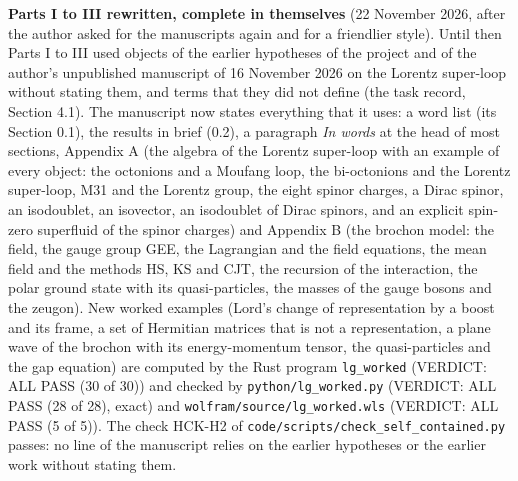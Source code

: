 \documentclass[
  10pt,
]{article}
\begin{document}
\textbf{Parts I to III rewritten, complete in themselves} (22 November
2026, after the author asked for the manuscripts again and for a
friendlier style). Until then Parts I to III used objects of the earlier
hypotheses of the project and of the author's unpublished manuscript of
16 November 2026 on the Lorentz super-loop without stating them, and
terms that they did not define (the task record, Section 4.1). The
manuscript now states everything that it uses: a word list (its Section
0.1), the results in brief (0.2), a paragraph \emph{In words} at the
head of most sections, Appendix A (the algebra of the Lorentz super-loop
with an example of every object: the octonions and a Moufang loop, the
bi-octonions and the Lorentz super-loop, M31 and the Lorentz group, the
eight spinor charges, a Dirac spinor, an isodoublet, an isovector, an
isodoublet of Dirac spinors, and an explicit spin-zero superfluid of the
spinor charges) and Appendix B (the brochon model: the field, the gauge
group GEE, the Lagrangian and the field equations, the mean field and
the methods HS, KS and CJT, the recursion of the interaction, the polar
ground state with its quasi-particles, the masses of the gauge bosons
and the zeugon). New worked examples (Lord's change of representation by
a boost and its frame, a set of Hermitian matrices that is not a
representation, a plane wave of the brochon with its energy-momentum
tensor, the quasi-particles and the gap equation) are computed by the
Rust program \texttt{lg\_worked} (VERDICT: ALL PASS (30 of 30)) and
checked by \texttt{python/lg\_worked.py} (VERDICT: ALL PASS (28 of 28),
exact) and \texttt{wolfram/source/lg\_worked.wls} (VERDICT: ALL PASS (5
of 5)). The check HCK-H2 of
\texttt{code/scripts/check\_self\_contained.py} passes: no line of the
manuscript relies on the earlier hypotheses or the earlier work without
stating them.
\end{document}
